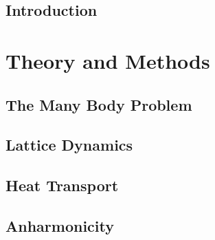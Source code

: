 \documentclass[nobib,a4paper,twoside,notoc,justified,marginals=justified]{tufte-book}
\newcommand{\blankpage}{\newpage\hbox{}\thispagestyle{empty}\newpage}
\begin{document}
  \frontmatter
  
%  

\tableofcontents





\cleardoublepage
{}
\chapter{Introduction}


\mainmatter

\part{Theory and Methods}

\chapter{The Many Body Problem}



\chapter{Lattice Dynamics}


\chapter{Heat Transport}


\chapter{Anharmonicity}

\end{document}
